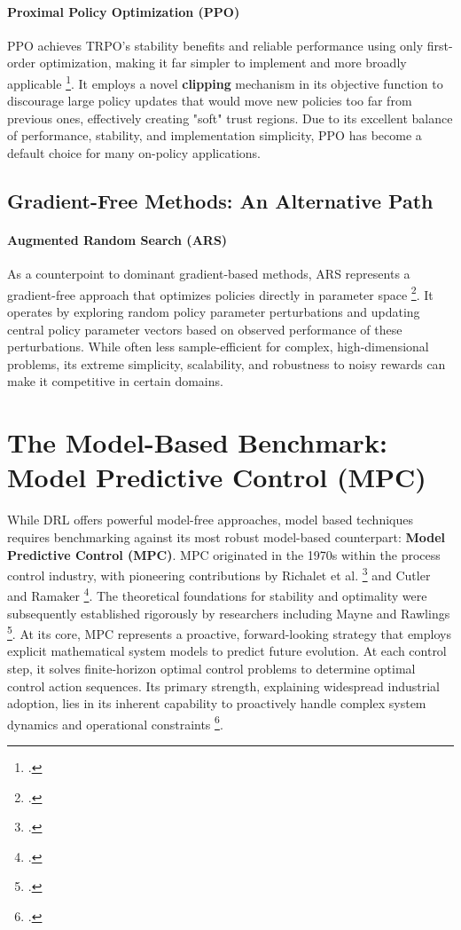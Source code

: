 \paragraph{Proximal Policy Optimization (PPO)}

PPO achieves TRPO's stability benefits and reliable performance using only first-order optimization, making it far simpler to implement and more broadly applicable \footcite{schulman2017proximal}. It employs a novel \textbf{clipping} mechanism in its objective function to discourage large policy updates that would move new policies too far from previous ones, effectively creating "soft" trust regions. Due to its excellent balance of performance, stability, and implementation simplicity, PPO has become a default choice for many on-policy applications.

\subsection{Gradient-Free Methods: An Alternative Path}

\paragraph{Augmented Random Search (ARS)}

As a counterpoint to dominant gradient-based methods, ARS represents a gradient-free approach that optimizes policies directly in parameter space \footcite{mania2018simple}. It operates by exploring random policy parameter perturbations and updating central policy parameter vectors based on observed performance of these perturbations. While often less sample-efficient for complex, high-dimensional problems, its extreme simplicity, scalability, and robustness to noisy rewards can make it competitive in certain domains.

\section{The Model-Based Benchmark: Model Predictive Control (MPC)}

While DRL offers powerful model-free approaches, model based techniques  requires benchmarking against its most robust model-based counterpart: \textbf{Model Predictive Control (MPC)}. MPC originated in the 1970s within the process control industry, with pioneering contributions by Richalet et al. \footcite{Richalet1978ModelPH} and Cutler and Ramaker \footcite{Cutler1980}. The theoretical foundations for stability and optimality were subsequently established rigorously by researchers including Mayne and Rawlings \footcite{mayne2000constraine}.
\noindent
At its core, MPC represents a proactive, forward-looking strategy that employs explicit mathematical system models to predict future evolution. At each control step, it solves finite-horizon optimal control problems to determine optimal control action sequences. Its primary strength, explaining widespread industrial adoption, lies in its inherent capability to proactively handle complex system dynamics and operational constraints \footcite{minchala2025systematic}.
